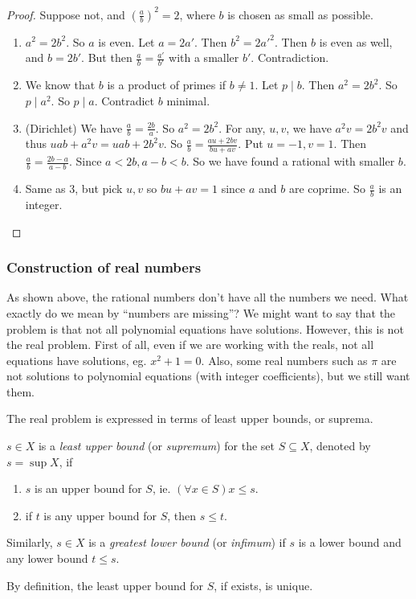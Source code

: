 \documentclass[a4paper]{article}
\begin{document}
\begin{proof}
  Suppose not, and $(\frac{a}{b})^2 = 2$, where $b$ is chosen as small as possible.

  \begin{enumerate}
    \item $a^2 = 2b^2$. So $a$ is even. Let $a = 2a'$. Then $b^2 = 2a'^2$. Then $b$ is even as well, and $b = 2b'$. But then $\frac{a}{b} = \frac{a'}{b'}$ with a smaller $b'$. Contradiction.
    \item We know that $b$ is a product of primes if $b \not= 1$. Let $p \mid b$. Then $a^2 = 2b^2$. So $p \mid a^2$. So $p \mid a$. Contradict $b$ minimal.
    \item (Dirichlet) We have $\frac{a}{b} = \frac{2b}{a}$. So $a^2 = 2b^2$. For any, $u, v$, we have $a^2v = 2b^2v$ and thus $uab + a^2v = uab + 2b^2v$. So $\frac{a}{b} = \frac{au + 2bv}{bu + av}$. Put $u = -1, v = 1$. Then $\frac{a}{b} = \frac{2b - a}{a - b}$. Since $a < 2b, a - b < b$. So we have found a rational with smaller $b$.
    \item Same as 3, but pick $u, v$ so $bu + av = 1$ since $a$ and $b$ are coprime. So $\frac{a}{b}$ is an integer.
  \end{enumerate}
\end{proof}

\subsubsection*{Construction of real numbers}
As shown above, the rational numbers don't have all the numbers we need. What exactly do we mean by ``numbers are missing''? We might want to say that the problem is that not all polynomial equations have solutions. However, this is not the real problem. First of all, even if we are working with the reals, not all equations have solutions, eg. $x^2 + 1 = 0$. Also, some real numbers such as $\pi$ are not solutions to polynomial equations (with integer coefficients), but we still want them.

The real problem is expressed in terms of least upper bounds, or suprema.

\begin{defi}
  $s\in X$ is a \emph{least upper bound} (or \emph{supremum}) for the set $S\subseteq X$, denoted by $s = \sup X$, if
  \begin{enumerate}
    \item $s$ is an upper bound for $S$, ie. $(\forall x\in S) x \leq s$.
    \item if $t$ is any upper bound for $S$, then $s \leq t$.
  \end{enumerate}

  Similarly, $s\in X$ is a \emph{greatest lower bound} (or \emph{infimum}) if $s$ is a lower bound and any lower bound $t \leq s$.
\end{defi}
By definition, the least upper bound for $S$, if exists, is unique.
\end{document}
